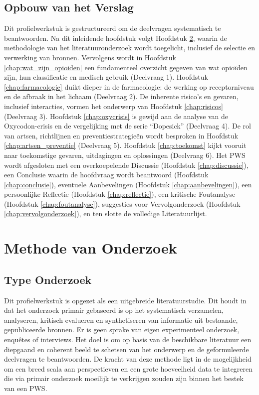 \documentclass[11pt, a4paper]{report} %
\begin{document}
\section{Opbouw van het Verslag}
Dit profielwerkstuk is gestructureerd om de deelvragen systematisch te beantwoorden. Na dit inleidende hoofdstuk volgt Hoofdstuk \ref{chap:methode}, waarin de methodologie van het literatuuronderzoek wordt toegelicht, inclusief de selectie en verwerking van bronnen. Vervolgens wordt in Hoofdstuk \ref{chap:wat_zijn_opioiden} een fundamenteel overzicht gegeven van wat opioïden zijn, hun classificatie en medisch gebruik (Deelvraag 1). Hoofdstuk \ref{chap:farmacologie} duikt dieper in de farmacologie: de werking op receptorniveau en de afbraak in het lichaam (Deelvraag 2). De inherente risico's en gevaren, inclusief interacties, vormen het onderwerp van Hoofdstuk \ref{chap:risicos} (Deelvraag 3). Hoofdstuk \ref{chap:oxycrisis} is gewijd aan de analyse van de Oxycodon-crisis en de vergelijking met de serie \enquote{Dopesick} (Deelvraag 4). De rol van artsen, richtlijnen en preventiestrategieën wordt besproken in Hoofdstuk \ref{chap:artsen_preventie} (Deelvraag 5). Hoofdstuk \ref{chap:toekomst} kijkt vooruit naar toekomstige gevaren, uitdagingen en oplossingen (Deelvraag 6). Het PWS wordt afgesloten met een overkoepelende Discussie (Hoofdstuk \ref{chap:discussie}), een Conclusie waarin de hoofdvraag wordt beantwoord (Hoofdstuk \ref{chap:conclusie}), eventuele Aanbevelingen (Hoofdstuk \ref{chap:aanbevelingen}), een persoonlijke Reflectie (Hoofdstuk \ref{chap:reflectie}), een kritische Foutanalyse (Hoofdstuk \ref{chap:foutanalyse}), suggesties voor Vervolgonderzoek (Hoofdstuk \ref{chap:vervolgonderzoek}), en ten slotte de volledige Literatuurlijst.


\chapter{Methode van Onderzoek}
\label{chap:methode}

\section{Type Onderzoek}
Dit profielwerkstuk is opgezet als een uitgebreide literatuurstudie. Dit houdt in dat het onderzoek primair gebaseerd is op het systematisch verzamelen, analyseren, kritisch evalueren en synthetiseren van informatie uit bestaande, gepubliceerde bronnen. Er is geen sprake van eigen experimenteel onderzoek, enquêtes of interviews. Het doel is om op basis van de beschikbare literatuur een diepgaand en coherent beeld te schetsen van het onderwerp en de geformuleerde deelvragen te beantwoorden. De kracht van deze methode ligt in de mogelijkheid om een breed scala aan perspectieven en een grote hoeveelheid data te integreren die via primair onderzoek moeilijk te verkrijgen zouden zijn binnen het bestek van een PWS.
\end{document}
